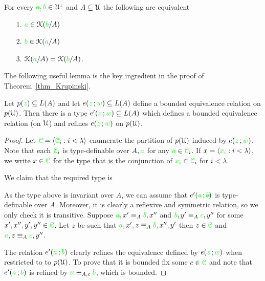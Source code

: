 \begin{corollary}\label{corol_KP_simmetry}
For every ${\color{green} a},{\color{green} b}\in\EuScript U^{\color{green} z}$ and $A\subseteq\EuScript U$ the following are equivalent
\begin{itemize}
\item[1.] ${\color{green} a}\in\EuScript K({\color{green} b}/A)$
\item[2.] ${\color{green} b}\in\EuScript K({\color{green} a}/A)$
\item[3.] $\EuScript K({\color{green} a}/A)=\EuScript K({\color{green} b}/A)$.
\end{itemize}
\end{corollary}

The following useful lemma is the key ingredient in the proof of Theorem~\ref{thm_Krupinski}.

\begin{lemma}\label{lem_beq_global}
Let $p({\color{green} z})\subseteq L(A)$ and let $e({\color{green} z}\,;{\color{green} w})\subseteq L(A)$ define a bounded equivalence relation on $p(\EuScript U)$.
Then there is a type $e'({\color{green} z}\,;{\color{green} w})\subseteq L(A)$ which defines a bounded equivalence relation (on $\EuScript U$) and refines $e({\color{green} z}\,;{\color{green} w})$ on  $p(\EuScript U)$.
\end{lemma}
\begin{proof} 
Let ${\color{green}\EuScript C}=\langle{\color{green}\EuScript C}_i:i<\lambda\rangle$ enumerate the partition of $p(\EuScript U)$ induced by $e({\color{green} z}\,;{\color{green} w})$.
Note that each ${\color{green}\EuScript C}_i$ is type-definable over $A,{\color{green} a}$ for any ${\color{green} a}\in{\color{green}\EuScript C}_i$.
If $x=\langle{\color{green}x_i}:i<\lambda\rangle$, we write $x\in{\color{green}\EuScript C}$ for the type that is the conjunction of ${\color{green} x_i}\in{\color{green}\EuScript C}_i$ for $i<\lambda$. 

We claim that the required type is 


As the type above is invariant over $A$, we can assume that $e'({\color{green} a}\,;{\color{green} b})$ is type-definable over $A$.
Moreover, it is clearly a reflexive and symmetric relation, so we only check it is transitive.
Suppose ${\color{green} a},x'\equiv_A{\color{green} b},x''$ and  ${\color{green} b},y'\equiv_A{\color{green} c},y''$ for some $x',x'',y',y''\in {\color{green}\EuScript C}$.
Let $z$ be such that ${\color{green} a},x',z\equiv_A{\color{green} b},x'',y'$ then   $z\in{\color{green}\EuScript C}$ and ${\color{green} a},z\equiv_A{\color{green} c},y''$.

The relation $e'({\color{green} a}\,;{\color{green} b})$ clearly refines the equivalence defined by $e({\color{green} z}\,;{\color{green} w})$ when restricted to  to $p(\EuScript U)$.
To prove that it is bounded fix some $c\in{\color{green}\EuScript C}$ and note that $e'({\color{green} a}\,;{\color{green} b})$  is refined by ${\color{green} a}\equiv_{A,c}{\color{green} b}$, which is bounded. 
\end{proof}

